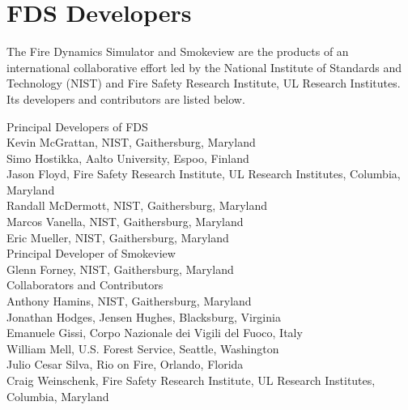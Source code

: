 \chapter{FDS Developers}

The Fire Dynamics Simulator and Smokeview are the products of an international collaborative effort led by
the National Institute of Standards and Technology (NIST) and Fire Safety Research Institute, UL Research Institutes. Its developers and
contributors are listed below.

\vspace{0.3in}

\begin{flushleft}

Principal Developers of FDS  \\ [0.2in]

Kevin McGrattan, NIST, Gaithersburg, Maryland \\
Simo Hostikka, Aalto University, Espoo, Finland \\
Jason Floyd, Fire Safety Research Institute, UL Research Institutes, Columbia, Maryland \\
Randall McDermott, NIST, Gaithersburg, Maryland \\
Marcos Vanella, NIST, Gaithersburg, Maryland \\
Eric Mueller, NIST, Gaithersburg, Maryland \\ [0.3in]

Principal Developer of Smokeview  \\ [0.2in]

Glenn Forney, NIST, Gaithersburg, Maryland \\ [0.3in]

Collaborators and Contributors \\ [0.2in]

Anthony Hamins, NIST, Gaithersburg, Maryland \\
Jonathan Hodges, Jensen Hughes, Blacksburg, Virginia \\
Emanuele Gissi, Corpo Nazionale dei Vigili del Fuoco, Italy \\
William Mell, U.S. Forest Service, Seattle, Washington \\
Julio Cesar Silva, Rio on Fire, Orlando, Florida  \\
Craig Weinschenk, Fire Safety Research Institute, UL Research Institutes, Columbia, Maryland

\end{flushleft}


